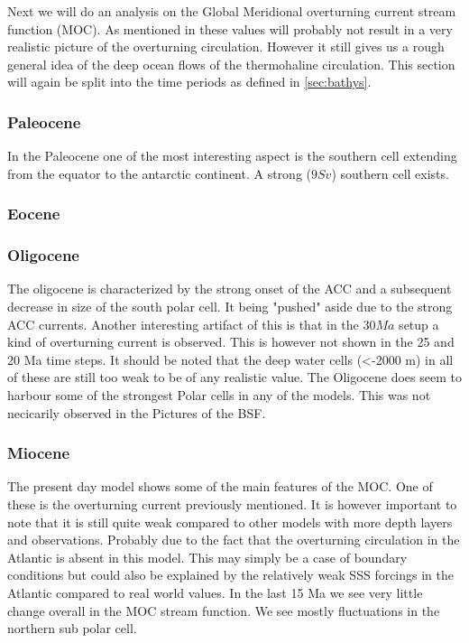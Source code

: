 Next we will do an analysis on the Global Meridional overturning current stream function (MOC). As mentioned in  these values will probably not result in a very realistic picture of the overturning circulation. However it still gives us a rough general idea of the deep ocean flows of the thermohaline circulation. This section will again be split into the time periods as defined in \ref{sec:bathys}.

\subsubsection{Paleocene}
In the Paleocene one of the most interesting aspect is the southern cell extending from the equator to the antarctic continent. A strong ($9 Sv$) southern cell exists. 

\subsubsection{Eocene}

\subsubsection{Oligocene}
The oligocene is characterized by the strong onset of the ACC and a subsequent decrease in size of the south polar cell. It being "pushed" aside due to the strong ACC currents. Another interesting artifact of this is that in the $30 Ma$ setup a kind of overturning current is observed. This is however not shown in the 25 and 20 Ma time steps. It should be noted that the deep water cells (<-2000 m) in all of these are still too weak to be of any realistic value. The Oligocene does seem to harbour some of the strongest Polar cells in any of the models. This was not necicarily observed in the Pictures of the BSF.

\subsubsection{Miocene}

The present day model shows some of the main features of the MOC. One of these is the overturning current previously mentioned. It is however important to note that it is still quite weak compared to other models with more depth layers and observations. Probably due to the fact that the overturning circulation in the Atlantic is absent in this model. This may simply be a case of boundary conditions but could also be explained by the relatively weak SSS forcings in the Atlantic compared to real world values. In the last 15 Ma we see very little change overall in the MOC stream function. We see mostly fluctuations in the northern sub polar cell. 